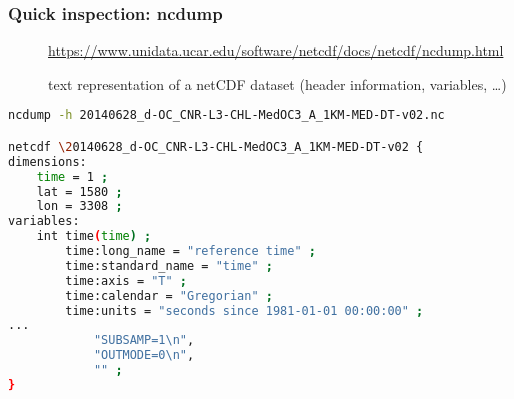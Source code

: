 \begin{frame}[c, fragile]
\frametitle{Quick inspection: ncdump}

\begin{description}
\item[\homepage] {\scriptsize \url{https://www.unidata.ucar.edu/software/netcdf/docs/netcdf/ncdump.html}}
\item[\tool] text representation of a netCDF dataset (header information, variables, \ldots)
\end{description}

\vfill

\begin{lstlisting}[language=bash,basicstyle=\tiny,title={ncdump applied on a file}]
ncdump -h 20140628_d-OC_CNR-L3-CHL-MedOC3_A_1KM-MED-DT-v02.nc

netcdf \20140628_d-OC_CNR-L3-CHL-MedOC3_A_1KM-MED-DT-v02 {
dimensions:
	time = 1 ;
	lat = 1580 ;
	lon = 3308 ;
variables:
	int time(time) ;
		time:long_name = "reference time" ;
		time:standard_name = "time" ;
		time:axis = "T" ;
		time:calendar = "Gregorian" ;
		time:units = "seconds since 1981-01-01 00:00:00" ;
...
			"SUBSAMP=1\n",
			"OUTMODE=0\n",
			"" ;
}

\end{lstlisting}

\end{frame}

